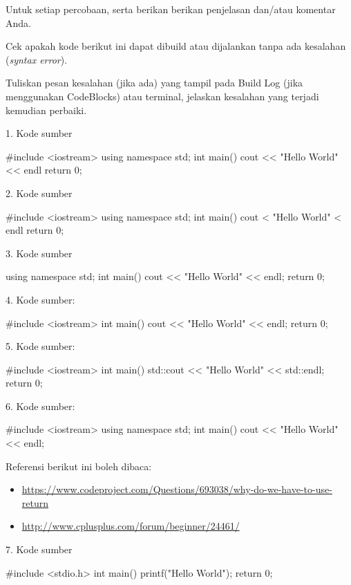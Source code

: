 \documentclass[a4paper,11pt]{extarticle}
\begin{document}
Untuk setiap percobaan, 
serta berikan berikan penjelasan dan/atau komentar Anda.

Cek apakah kode berikut ini dapat dibuild atau dijalankan tanpa
ada kesalahan (\textit{syntax error}).

Tuliskan pesan kesalahan (jika ada) yang tampil pada \textsf{Build Log}
(jika menggunakan CodeBlocks) atau terminal, jelaskan kesalahan
yang terjadi kemudian perbaiki.

1. Kode sumber
\begin{cppcode}
#include <iostream>
using namespace std;
int main()
{
  cout << "Hello World" << endl
  return 0;
}
\end{cppcode}

2. Kode sumber
\begin{cppcode}
#include <iostream>
using namespace std;
int main()
{
  cout < "Hello World" < endl
  return 0;
}
\end{cppcode}

3. Kode sumber
\begin{cppcode}
using namespace std;
int main()
{
  cout << "Hello World" << endl;
  return 0;
}
\end{cppcode}


4. Kode sumber:
\begin{cppcode}
#include <iostream>
int main()
{
  cout << "Hello World" << endl;
  return 0;
}
\end{cppcode}

5. Kode sumber:
\begin{cppcode}
#include <iostream>
int main()
{
  std::cout << "Hello World" << std::endl;
  return 0;
}
\end{cppcode}


6. Kode sumber:
\begin{cppcode}
#include <iostream>
using namespace std;
int main()
{
  cout << "Hello World" << endl;
}
\end{cppcode}

Referensi berikut ini boleh dibaca:
\begin{itemize}
\item \url{https://www.codeproject.com/Questions/693038/why-do-we-have-to-use-return}
\item \url{http://www.cplusplus.com/forum/beginner/24461/}
\end{itemize}

7. Kode sumber
\begin{cppcode}
#include <stdio.h>
int main()
{
  printf("Hello World\n");
  return 0;
}
\end{cppcode}
\end{document}
